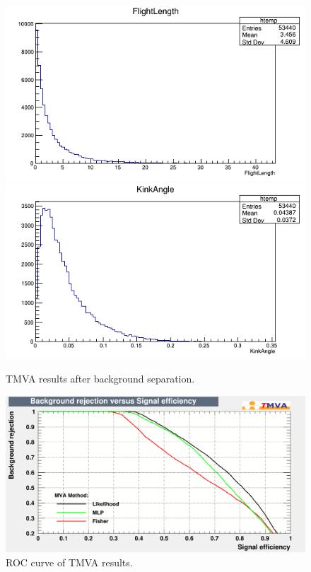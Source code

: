 \documentclass[12pt]{report}
\begin{document}
\begin{figure}[htp]
\centering
\includegraphics[width = \linewidth]{TMVAFLength.png}
\includegraphics[width = \linewidth]{TMVAKAngle.png}
\caption{TMVA results after background separation.}
\label{fig:TMVARoot}
\end{figure}

\begin{figure}[htp]
\centering
\includegraphics[width = \linewidth]{BvsS_ROC.png}
\caption{ROC curve of TMVA results.}
\label{fig:ROC}
\end{figure}
\end{document}

